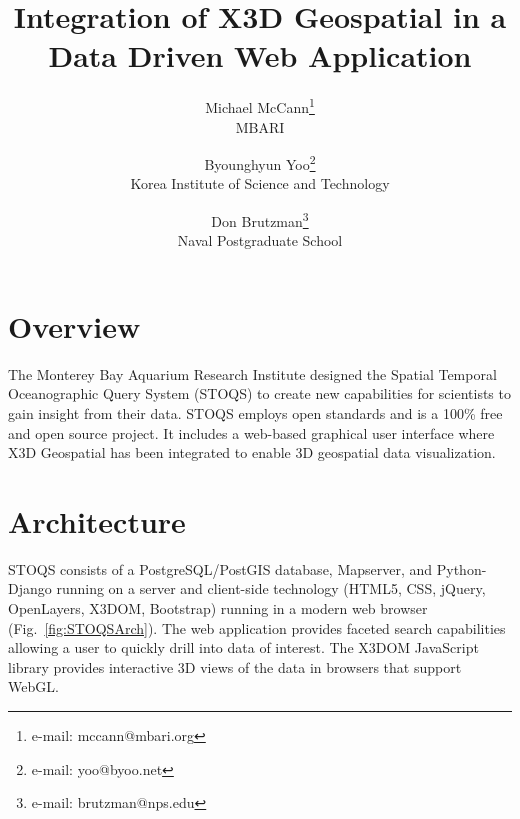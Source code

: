 \documentclass[annualconference]{acmsiggraph}  %
\title{Integration of X3D Geospatial in a Data Driven Web Application}
\author{Michael McCann\thanks{e-mail: mccann@mbari.org}\\MBARI
\and Byounghyun Yoo\thanks{e-mail: yoo@byoo.net}\\Korea Institute of Science and Technology
\and Don Brutzman\thanks{e-mail: brutzman@nps.edu}\\Naval Postgraduate School}
\begin{document}

\maketitle




\begin{CRcatlist}
\end{CRcatlist}

\keywordlist


\copyrightspace

\section{Overview}

The Monterey Bay Aquarium Research Institute designed the Spatial Temporal Oceanographic Query System (STOQS) \cite{STOQS} to create new capabilities for scientists to gain insight from their data. STOQS employs open standards and is a 100\% free and open source project. It includes a web-based graphical user interface where X3D Geospatial has been integrated to enable 3D geospatial data visualization. 

\section{Architecture}

STOQS consists of a PostgreSQL/PostGIS database, Mapserver, and Python-Django running on a server and client-side technology (HTML5, CSS, jQuery, OpenLayers, X3DOM, Bootstrap) running in a modern web browser (Fig.~\ref{fig:STOQSArch}). The web application provides faceted search capabilities allowing a user to quickly drill into data of interest. The X3DOM JavaScript library provides interactive 3D views of the data in browsers that support WebGL.  
\end{document}
